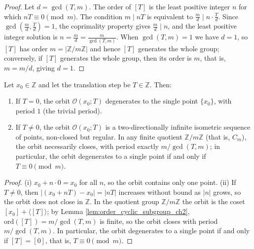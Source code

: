 \begin{proof}
Let $d = \gcd(T,m)$. The order of $[T]$ is the least positive integer $n$ for which $nT \equiv 0 \pmod{m}$. The condition $m \mid nT$ is equivalent to $\frac{m}{d} \mid n \cdot \frac{T}{d}$. Since $\gcd\!\left(\frac{m}{d}, \frac{T}{d}\right) = 1$, the coprimality property gives $\frac{m}{d} \mid n$, and the least positive integer solution is $n = \frac{m}{d} = \frac{m}{\gcd(T,m)}$. When $\gcd(T,m) = 1$ we have $d = 1$, so $[T]$ has order $m = |\mathbb{Z}/m\mathbb{Z}|$ and hence $[T]$ generates the whole group; conversely, if $[T]$ generates the whole group, then its order is $m$, that is, $m = m/d$, giving $d = 1$.
\end{proof}

\begin{theorem}\label{thm:integer_translation_criterion}
Let $x_0 \in \mathbb{Z}$ and let the translation step be $T \in \mathbb{Z}$. Then:
\begin{enumerate}[label=(\roman*)]
    \item If $T = 0$, the orbit $\mathcal{O}(x_0; T)$ degenerates to the single point $\{x_0\}$, with period $1$ (the trivial period).
    \item If $T \neq 0$, the orbit $\mathcal{O}(x_0; T)$ is a two-directionally infinite isometric sequence of points, non-closed but regular. In any finite quotient $\mathbb{Z}/m\mathbb{Z}$ (that is, $C_m$), the orbit necessarily closes, with period exactly $m/\gcd(T,m)$; in particular, the orbit degenerates to a single point if and only if $T \equiv 0 \pmod{m}$.
\end{enumerate}
\end{theorem}

\begin{proof}
(i) $x_0 + n\cdot 0 = x_0$ for all $n$, so the orbit contains only one point.
(ii) If $T \neq 0$, then $|(x_0+nT) - x_0| = |nT|$ increases without bound as $|n|$ grows, so the orbit does not close in $\mathbb{Z}$. In the quotient group $\mathbb{Z}/m\mathbb{Z}$ the orbit is the coset $[x_0] + \langle [T] \rangle$; by Lemma \ref{lem:order_cyclic_subgroup_ch2}, $\mathrm{ord}([T]) = m/\gcd(T,m)$ is finite, so the orbit closes with period $m/\gcd(T,m)$. In particular, the orbit degenerates to a single point if and only if $[T] = [0]$, that is, $T \equiv 0 \pmod{m}$.
\end{proof}

